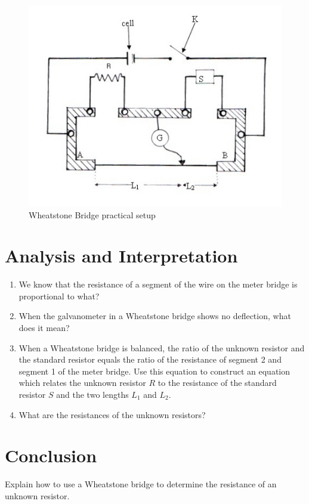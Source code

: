 \begin{figure}[h!]
\centering
\includegraphics[width=12cm]{./img/wheatstone-bridge-1.jpg}
\caption{Wheatstone Bridge practical setup}
\label{fig:wheatstone-bridge-1}
\end{figure}

\section{Analysis and Interpretation}
\begin{enumerate}
\item We know that the resistance of a segment of the wire on the meter bridge is proportional to what?
\item When the galvanometer in a Wheatstone bridge shows no deflection, what does it mean?
\item When a Wheatstone bridge is balanced, the ratio of the unknown resistor and the standard resistor equals the ratio of the resistance of segment 2 and segment 1 of the meter bridge. Use this equation to construct an equation which relates the unknown resistor $R$ to the resistance of the standard resistor $S$ and the two lengths $L_1$ and $L_2$.
\item What are the resistances of the unknown resistors?
\end{enumerate}

\section{Conclusion}
Explain how to use a Wheatstone bridge to determine the resistance of an unknown resistor. 

